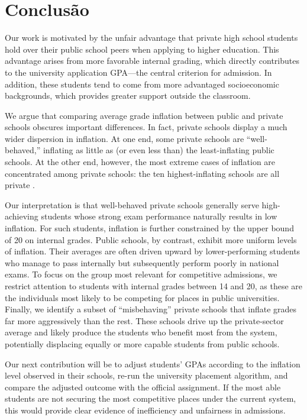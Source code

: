 \documentclass{article}
\begin{document}
\section{Conclusão}

Our work is motivated by the unfair advantage that private high school students hold over their public school peers when applying to higher education. This advantage arises from more favorable internal grading, which directly contributes to the university application GPA—the central criterion for admission. In addition, these students tend to come from more advantaged socioeconomic backgrounds, which provides greater support outside the classroom.

We argue that comparing average grade inflation between public and private schools obscures important differences. In fact, private schools display a much wider dispersion in inflation. At one end, some private schools are “well-behaved,” inflating as little as (or even less than) the least-inflating public schools. At the other end, however, the most extreme cases of inflation are concentrated among private schools: the ten highest-inflating schools are all private \citep{sapo2024}. %

Our interpretation is that well-behaved private schools generally serve high-achieving students whose strong exam performance naturally results in low inflation. For such students, inflation is further constrained by the upper bound of 20 on internal grades. Public schools, by contrast, exhibit more uniform levels of inflation. Their averages are often driven upward by lower-performing students who manage to pass internally but subsequently perform poorly in national exams. To focus on the group most relevant for competitive admissions, we restrict attention to students with internal grades between 14 and 20, as these are the individuals most likely to be competing for places in public universities. Finally, we identify a subset of “misbehaving” private schools that inflate grades far more aggressively than the rest. These schools drive up the private-sector average and likely produce the students who benefit most from the system, potentially displacing equally or more capable students from public schools.

Our next contribution will be to adjust students’ GPAs according to the inflation level observed in their schools, re-run the university placement algorithm, and compare the adjusted outcome with the official assignment. If the most able students are not securing the most competitive places under the current system, this would provide clear evidence of inefficiency and unfairness in admissions.
\end{document}
